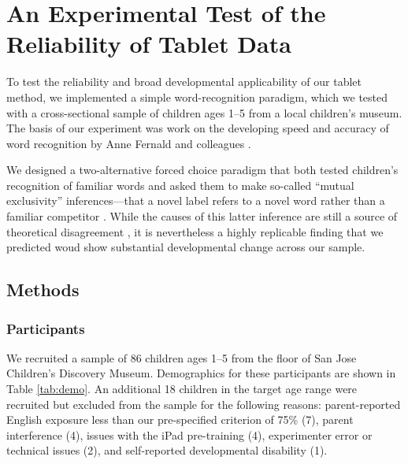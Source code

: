 \documentclass[man,noapacite]{apa2}
\begin{document}
\section{An Experimental Test of the Reliability of Tablet Data}
 
To test the reliability and broad developmental applicability of our tablet method, we implemented a simple word-recognition paradigm, which we tested with a cross-sectional sample of children ages 1--5 from a local children's museum. The basis of our experiment was work on the developing speed and accuracy of word recognition by Anne Fernald and colleagues \cite{fernald1998,fernald2006,bion2013}. 

We designed a two-alternative forced choice paradigm that both tested children's recognition of familiar words and asked them to make so-called ``mutual exclusivity'' inferences---that a novel label refers to a novel word rather than a familiar competitor \cite{markman1988}. While the causes of this latter inference are still a source of theoretical disagreement \cite{markman2003,diesendruck2001,frank2009,bion2013}, it is nevertheless a highly replicable finding that we predicted woud show substantial developmental change across our sample.  

\subsection{Methods}

\subsubsection{Participants}                                                                                                                              


We recruited a sample of 86 children ages 1--5 from the floor of San Jose Children's Discovery Museum. Demographics for these participants are shown in Table \ref{tab:demo}. An additional 18 children in the target age range were recruited but excluded from the sample for the following reasons: parent-reported English exposure less than our pre-specified criterion of 75\% (7), parent interference (4), issues with the iPad pre-training (4), experimenter error or technical issues (2), and self-reported developmental disability (1). 
\end{document}
